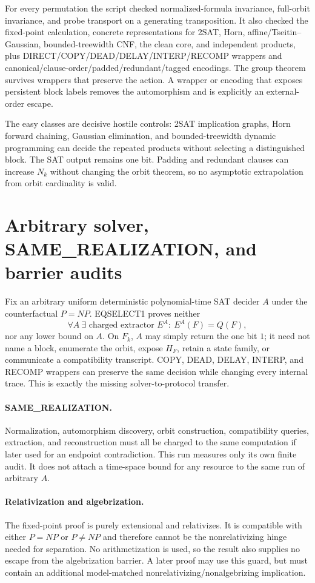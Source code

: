 \documentclass[11pt]{article}
\begin{document}
For every permutation the script checked normalized-formula invariance, full-orbit invariance, and probe transport on a generating transposition.  It also checked the fixed-point calculation, concrete representations for 2SAT, Horn, affine/Tseitin--Gaussian, bounded-treewidth CNF, the clean core, and independent products, plus DIRECT/COPY/DEAD/DELAY/INTERP/RECOMP wrappers and canonical/clause-order/padded/redundant/tagged encodings.  The group theorem survives wrappers that preserve the action.  A wrapper or encoding that exposes persistent block labels removes the automorphism and is explicitly an external-order escape.

The easy classes are decisive hostile controls: 2SAT implication graphs, Horn forward chaining, Gaussian elimination, and bounded-treewidth dynamic programming can decide the repeated products without selecting a distinguished block.  The SAT output remains one bit.  Padding and redundant clauses can increase $N_k$ without changing the orbit theorem, so no asymptotic extrapolation from orbit cardinality is valid.

\section{Arbitrary solver, SAME\_REALIZATION, and barrier audits}

Fix an arbitrary uniform deterministic polynomial-time SAT decider $A$ under the counterfactual $P=NP$.  EQSELECT1 proves neither
\[
 \forall A\ \exists\text{ charged extractor }E^A:\ E^A(F)=Q(F),
\]
nor any lower bound on $A$.  On $F_k$, $A$ may simply return the one bit $1$; it need not name a block, enumerate the orbit, expose $H_F$, retain a state family, or communicate a compatibility transcript.  COPY, DEAD, DELAY, INTERP, and RECOMP wrappers can preserve the same decision while changing every internal trace.  This is exactly the missing solver-to-protocol transfer.

\paragraph{SAME\_REALIZATION.}
Normalization, automorphism discovery, orbit construction, compatibility queries, extraction, and reconstruction must all be charged to the same computation if later used for an endpoint contradiction.  This run measures only its own finite audit.  It does not attach a time-space bound for any resource to the same run of arbitrary $A$.

\paragraph{Relativization and algebrization.}
The fixed-point proof is purely extensional and relativizes.  It is compatible with either $P=NP$ or $P\ne NP$ and therefore cannot be the nonrelativizing hinge needed for separation.  No arithmetization is used, so the result also supplies no escape from the algebrization barrier.  A later proof may use this guard, but must contain an additional model-matched nonrelativizing/nonalgebrizing implication.
\end{document}
